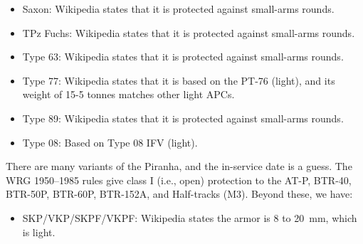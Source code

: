 {{\begin{itemize}
            \item Saxon: Wikipedia states that it is protected against small-arms rounds.
            \item TPz Fuchs: Wikipedia states that it is protected against small-arms rounds.
            \item Type 63: Wikipedia states that it is protected against small-arms rounds.
            \item Type 77: Wikipedia states that it is based on the PT-76 (light), and its weight of 15-5 tonnes matches other light APCs.
            \item Type 89: Wikipedia states that it is protected against small-arms rounds.
            \item Type 08: Based on Type 08 IFV (light).
        \end{itemize}

        There are many variants of the Piranha, and the in-service date is a guess.
        The WRG 1950--1985 rules give class I (i.e., open) protection to the
        AT-P,
        BTR-40,
        BTR-50P,
        BTR-60P,
        BTR-152A, and
        Half-tracks (M3).
        Beyond these, we have:
        \begin{itemize}
            \item SKP/VKP/SKPF/VKPF: Wikipedia states the armor is 8 to 20~mm, which is light.
        \end{itemize}
    }




}

